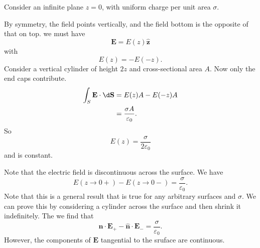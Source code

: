 \documentclass[a4paper]{article}
\begin{document}
\begin{eg}
  Consider an infinite plane $z = 0$, with uniform charge per unit area $\sigma$.

  \begin{center}
  \end{center}

  By symmetry, the field points vertically, and the field bottom is the opposite of that on top. we must have
  \[
    \mathbf{E} = E(z)\hat{\mathbf{z}}
  \]
  with
  \[
    E(z) = -E(-z).
  \]
  Consider a vertical cylinder of height $2z$ and cross-sectional area $A$. Now only the end caps contribute.
  \begin{align*}
    \int_S \mathbf{E} \cdot \d \mathbf{S} &= E(z) A - E(-z) A\\
    &=\frac{\sigma A}{\varepsilon _0}. 
  \end{align*}
  So
  \[
    E(z) = \frac{\sigma }{2\varepsilon_0}
  \]
  and is constant.

  Note that the electric field is discontinuous across the surface. We have
  \[
    E(z\to 0+) - E(z\to 0-) = \frac{\sigma}{\varepsilon_0}.
  \]
  Note that this is a general result that is true for any arbitrary surfaces and $\sigma$. We can prove this by considering a cylinder across the surface and then shrink it indefinitely. The we find that
  \[
    \hat{\mathbf{n}}\cdot \mathbf{E}_+ - \hat{\mathbf{n}}\cdot \mathbf{E}_- = \frac{\sigma}{\varepsilon_0}.
  \]
  However, the components of $\mathbf{E}$ tangential to the sruface are continuous. 
\end{eg}
\end{document}
